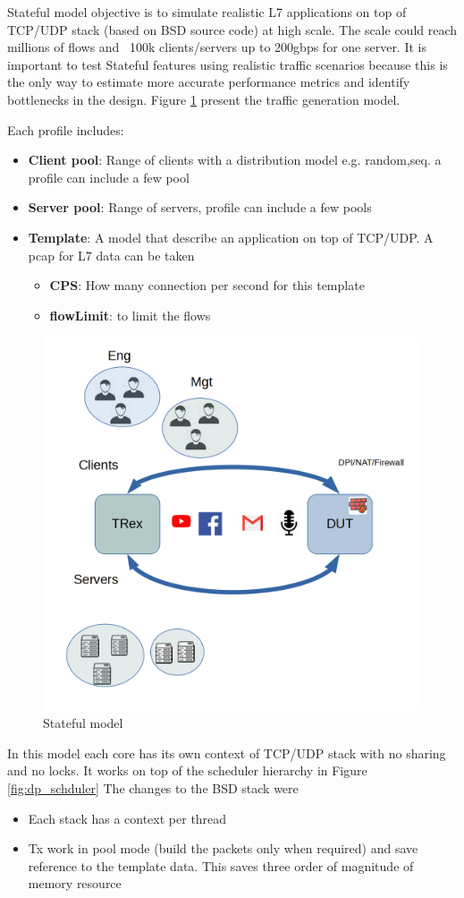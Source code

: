 \documentclass[conference]{IEEEtran}
\begin{document}
Stateful model objective is to simulate realistic L7 applications on top of TCP/UDP stack (based on BSD source code) at high scale.
The scale could reach millions of flows and ~100k clients/servers up to 200gbps for one server. 
It is important to test Stateful features using realistic traffic scenarios because this is the only way to estimate more accurate performance metrics and identify bottlenecks in the design. 
Figure \ref{fig:astf} present the traffic generation model. 

Each profile includes:
\begin{itemize}
  \item \textbf{Client pool}: Range of clients with a distribution model e.g. random,seq. a profile can include a few pool
  \item \textbf{Server pool}: Range of servers, profile can include a few pools 
  \item \textbf{Template}: A model that describe an application on top of TCP/UDP. A pcap for L7 data can be taken 
  \begin{itemize}
  \item \textbf{CPS}: How many connection per second for this template 
  \item \textbf{flowLimit}: to limit the flows 
  \end{itemize}
\end{itemize}

\begin{figure}[h]
  \includegraphics[width=0.3
  \textwidth, center]{stateful_model.png}
  \caption{Stateful model}
  \label{fig:astf}
\end{figure}

In this model each core has its own context of TCP/UDP stack with no sharing and no locks. It works on top of the scheduler hierarchy in Figure \ref{fig:dp_schduler}
The changes to the BSD stack were
\begin{itemize}
  \item Each stack has a context per thread 
  \item Tx work in pool mode (build the packets only when required) and save reference to the template data. This saves three order of magnitude of memory resource 
\end{itemize}
\end{document}
